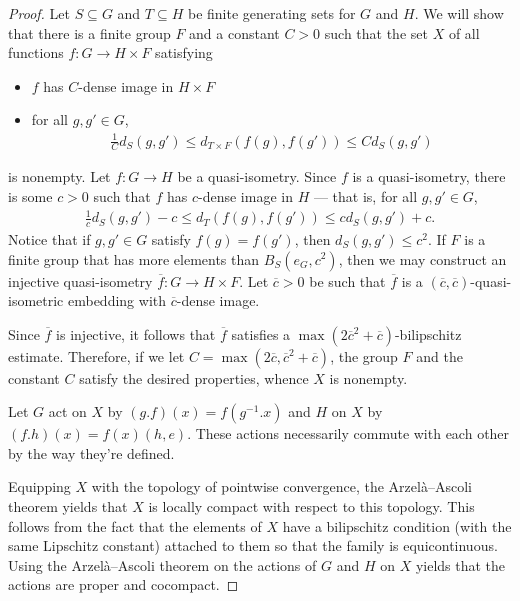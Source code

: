 \documentclass[10pt]{mypackage}
\begin{document}
\begin{proof}
  Let $S\subseteq G$ and $T\subseteq H$ be finite generating sets for $G$ and $H$. We will show that there is a finite group $F$ and a constant $C > 0$ such that the set $X$ of all functions $f\colon G\rightarrow H\times F$ satisfying
  \begin{itemize}
    \item $f$ has $C$-dense image in $H\times F$
    \item for all $g,g'\in G$,
      \begin{align*}
        \frac{1}{C}d_S\left( g,g' \right) \leq d_{T\times F} \left( f(g),f(g') \right) \leq Cd_S\left( g,g' \right)
      \end{align*}
  \end{itemize}
  is nonempty. Let $f\colon G\rightarrow H$ be a quasi-isometry. Since $f$ is a quasi-isometry, there is some $c > 0$ such that $f$ has $c$-dense image in $H$ --- that is, for all $g,g'\in G$,
  \begin{align*}
    \frac{1}{c}d_S\left( g,g' \right)-c \leq d_T\left( f(g),f(g') \right) \leq cd_S\left( g,g' \right) + c.
  \end{align*}
  Notice that if $g,g'\in G$ satisfy $f(g) = f(g')$, then $d_S\left( g,g' \right)\leq c^2$. If $F$ is a finite group that has more elements than $B_S\left( e_G,c^2 \right)$, then we may construct an injective quasi-isometry $ \overline{f}\colon G\rightarrow H\times F $. Let $ \overline{c} > 0 $ be such that $ \overline{f} $ is a $\left(  \overline{c}, \overline{c} \right)$-quasi-isometric embedding with $ \overline{c} $-dense image.

  Since $ \overline{f} $ is injective, it follows that $ \overline{f} $ satisfies a $\max\left( 2 \overline{c}^2 + \overline{c} \right)$-bilipschitz estimate. Therefore, if we let $C = \max\left( 2 \overline{c}, \overline{c}^2 + \overline{c} \right)$, the group $F$ and the constant $C$ satisfy the desired properties, whence $X$ is nonempty.

  Let $G$ act on $X$ by $\left( g.f \right)\left( x \right) = f\left( g^{-1}.x \right)$ and $H$ on $X$ by $\left( f.h \right)(x) = f(x)\left( h,e \right)$. These actions necessarily commute with each other by the way they're defined.

  Equipping $X$ with the topology of pointwise convergence, the Arzelà--Ascoli theorem yields that $X$ is locally compact with respect to this topology. This follows from the fact that the elements of $X$ have a bilipschitz condition (with the same Lipschitz constant) attached to them so that the family is equicontinuous. Using the Arzelà--Ascoli theorem on the actions of $G$ and $H$ on $X$ yields that the actions are proper and cocompact.
\end{proof}
\end{document}
